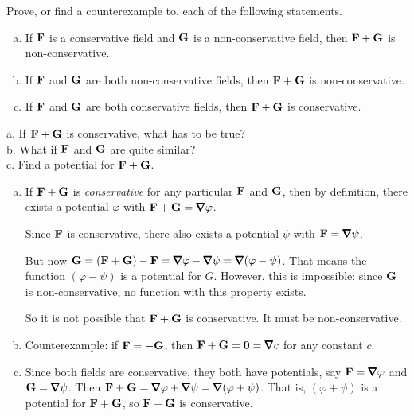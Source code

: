 \begin{question}
Prove, or find a counterexample to, each of the following statements.
\begin{enumerate}[a.]
\item
If $\mathbf{F}$ is a conservative field and $\mathbf{G}$ is  a non-conservative field, then $\mathbf{F}+\mathbf{G}$ is non-conservative.
\item
If $\mathbf{F}$ and $\mathbf{G}$ are both non-conservative fields, then $\mathbf{F}+\mathbf{G}$ is non-conservative.
\item If $\mathbf{F}$ and $\mathbf{G}$ are both conservative fields, then $\mathbf{F}+\mathbf{G}$ is conservative.

\end{enumerate}
\end{question}
\begin{hint}
a. If $\mathbf{F}+\mathbf{G}$ is conservative, what has to be true?\\
b. What if $\mathbf{F}$ and $\mathbf{G}$ are quite similar?\\
c. Find a potential for $\mathbf{F}+\mathbf{G}$.
\end{hint}
\begin{answer}
\begin{enumerate}[a.]
\item If $\mathbf{F}+\mathbf{G}$ is \emph{conservative} for any particular $\mathbf{F}$ and $\mathbf{G}$, then by definition, there exists a potential $\varphi$ with $\vF+\vG = \vnabla \varphi$. 

Since $\mathbf{F}$ is conservative, there also exists a potential $\psi$ with $\vF = \vnabla \psi$.

But now $\vG = (\vF+\vG)-\vF=\vnabla \varphi - \vnabla \psi = \vnabla(\varphi-\psi)$. That means the function $(\varphi-\psi)$ is a potential for $G$. However, this is impossible: since $\mathbf{G}$ is non-conservative, no function with this property exists.

So it is not possible that $\mathbf{F}+\mathbf{G}$ is conservative. It must be non-conservative.
\item Counterexample: if $\mathbf{F} = -\mathbf{G}$, then $\vF+\vG = \mathbf 0 = \vnabla c$ for any constant $c$.
\item Since both fields are conservative, they both have potentials, say $\vF=\vnabla \varphi$ and $\vG = \vnabla \psi$. Then $\vF+\vG = \vnabla\varphi+\vnabla\psi=\vnabla(\varphi+\psi)$. That is, $(\varphi+\psi)$ is a potential for $\mathbf{F}+\mathbf{G}$, so $\mathbf{F}+\mathbf{G}$ is conservative.

\end{enumerate}
\end{answer}
